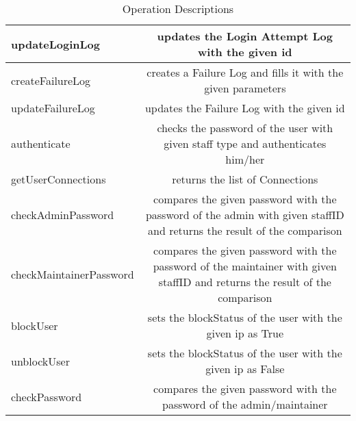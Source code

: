 \begin{table}[H]
	\centering
	\begin{tabular}{|l|C|}
		\hline
	updateLoginLog & updates the Login Attempt Log with the given id\\
	\hline
	createFailureLog & creates a Failure Log and fills it with the given parameters\\
	\hline
	updateFailureLog & updates the Failure Log with the given id\\
	\hline
	authenticate & checks the password of the user with given staff type and authenticates him/her\\
	\hline
	getUserConnections & returns the list of Connections \\
	\hline
	checkAdminPassword & compares the given password with the password of the admin with given staffID and returns the result of the comparison \\
	\hline
	checkMaintainerPassword & compares the given password with the password of the maintainer with given staffID and returns the result of the comparison \\
	\hline
	blockUser & sets the blockStatus of the user with the given ip as True \\
	\hline
	unblockUser & sets the blockStatus of the user with the given ip as False \\
	\hline
	checkPassword & compares the given password with the password of the admin/maintainer \\
	\hline
	\end{tabular}
	\caption{Operation Descriptions}
	\label{tab:operation_descriptions}
\end{table}